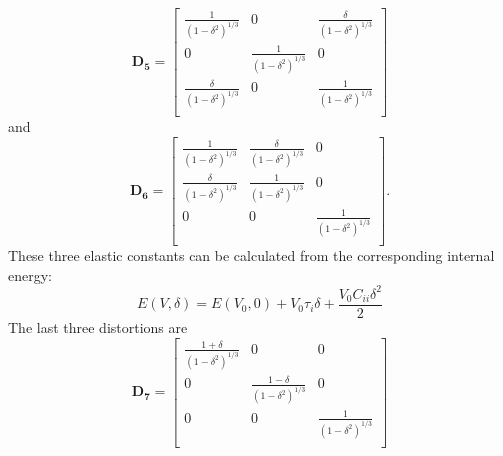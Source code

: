 \begin{equation}
\label{eq_D5}
	\mathbf{D_5} =  \begin{bmatrix}
						\frac{1}{(1-\delta^2)^{1/3}} & 0 & \frac{\delta}{(1-\delta^2)^{1/3}} \\
						0 & \frac{1}{(1-\delta^2)^{1/3}} & 0 \\
						\frac{\delta}{(1-\delta^2)^{1/3}} & 0 & \frac{1}{(1-\delta^2)^{1/3}} \\
						\end{bmatrix}
\end{equation}
and
\begin{equation}\label{eq_D6}
						\mathbf{D_6} = \begin{bmatrix}
						\frac{1}{(1-\delta^2)^{1/3}} & \frac{\delta}{(1-\delta^2)^{1/3}} & 0 \\
						\frac{\delta}{(1-\delta^2)^{1/3}} & \frac{1}{(1-\delta^2)^{1/3}} & 0 \\
						0 & 0 & \frac{1}{(1-\delta^2)^{1/3}} \\
						\end{bmatrix}.
\end{equation}	
These three elastic constants can be calculated from the corresponding internal energy:
\begin{equation}
							E(V,\delta) = E(V_0,0) + V_0\tau_i \delta + \frac{V_0C_{ii}\delta^2}{2}
\end{equation}
The last three distortions are
\begin{equation}\label{eq_D7}
						\mathbf{D_7} = \begin{bmatrix}
						\frac{1+\delta}{(1-\delta^2)^{1/3}} & 0 & 0 \\
						0 & \frac{1-\delta}{(1-\delta^2)^{1/3}} & 0 \\
						0 & 0 & \frac{1}{(1-\delta^2)^{1/3}} \\	
						\end{bmatrix}
\end{equation}			


